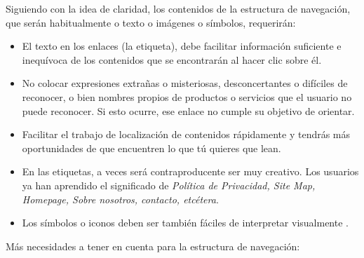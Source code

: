 \documentclass[a4paper,oneside,11pt]{book}
\begin{document}
		
		Siguiendo con la idea de claridad, los contenidos de la estructura de navegación, que serán habitualmente o texto o imágenes o símbolos, requerirán:
		\begin{itemize}
			\item El texto en los enlaces (la etiqueta), debe facilitar información suficiente e inequívoca de los contenidos que se encontrarán al hacer clic sobre él.
			\item No colocar expresiones extrañas o misteriosas, desconcertantes o difíciles de reconocer, o bien nombres propios de productos o servicios que el usuario no puede reconocer. Si esto ocurre, ese enlace no cumple su objetivo de orientar.
			\item Facilitar el trabajo de localización de contenidos rápidamente y tendrás más oportunidades de que encuentren lo que tú quieres que lean.
			\item En las etiquetas, a veces será contraproducente ser muy creativo. Los usuarios ya han aprendido el significado de \textit{Política de Privacidad, Site Map, Homepage, Sobre nosotros, contacto, etcétera}. 
			\item Los símbolos o iconos deben ser también fáciles de interpretar visualmente .
		\end{itemize}
		
		
		Más necesidades a tener en cuenta para la estructura de navegación:
		
\end{document}
